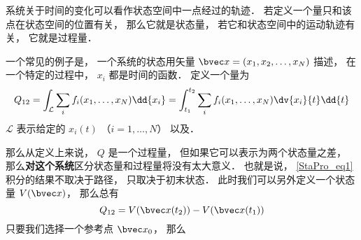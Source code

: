 
\begin{issues}
\issueDraft
\end{issues}

系统关于时间的变化可以看作状态空间中一点经过的轨迹． 若定义一个量只和该点在状态空间的位置有关， 那么它就是状态量， 若它和状态空间中的运动轨迹有关， 它就是过程量．

一个常见的例子是， 一个系统的状态用矢量 $\bvec x = (x_1, x_2, \dots, x_N)$ 描述， 在一个特定的过程中， $x_i$ 都是时间的函数． 定义一个量为
\begin{equation}\label{StaPro_eq1}
Q_{12} = \int_{\mathcal L} \sum_i f_i(x_1, \dots, x_N) \dd{x_i} = \int_{t_1}^{t_2} \sum_i f_i(x_1, \dots, x_N) \dv{x_i}{t} \dd{t}
\end{equation}
$\mathcal L$ 表示给定的 $x_i(t)$ （$i = 1,\dots, N$） 以及．

那么从定义上来说， $Q$ 是一个过程量， 但如果它可以表示为两个状态量之差， 那么\textbf{对这个系统}区分状态量和过程量将没有太大意义． 也就是说， \autoref{StaPro_eq1} 积分的结果不取决于路径， 只取决于初末状态． 此时我们可以另外定义一个状态量 $V(\bvec x)$， 那么总有
\begin{equation}
Q_{12} = V(\bvec x(t_2)) - V(\bvec x(t_1))
\end{equation}
只要我们选择一个参考点 $\bvec x_0$， 那么
